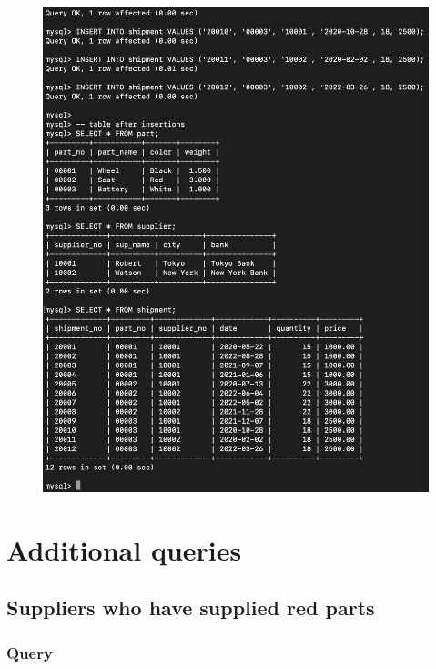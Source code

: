 \documentclass[12pt]{article}
\begin{document}
\begin{figure}[!hbt]
    \centering
    \includegraphics[scale=0.65]{screenshots/4b.png}
    \label{fig:my_label1}
\end{figure}
\newpage

\section{Additional queries}

\subsection{Suppliers who have supplied red parts}

\subsubsection{Query}
\end{document}
